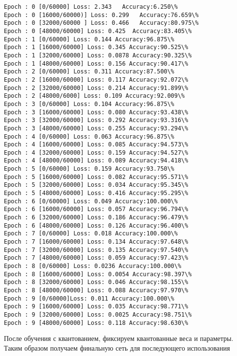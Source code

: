 \documentclass[oneside,final,12pt]{extreport}
\begin{document}
    \begin{Verbatim}[commandchars=\\\{\}]
Epoch : 0 [0/60000] Loss: 2.343   Accuracy:6.250\%
Epoch : 0 [16000/60000)] Loss: 0.299   Accuracy:76.659\%
Epoch : 0 [32000/60000 ] Loss: 0.466   Accuracy:80.975\%
Epoch : 0 [48000/60000] Loss: 0.425  Accuracy:83.405\%
Epoch : 1 [0/60000] Loss: 0.144 Accuracy:96.875\%
Epoch : 1 [16000/60000] Loss: 0.345 Accuracy:90.525\%
Epoch : 1 [32000/60000] Loss: 0.0878 Accuracy:90.325\%
Epoch : 1 [48000/60000] Loss: 0.156 Accuracy:90.417\%
Epoch : 2 [0/60000] Loss: 0.311 Accuracy:87.500\%
Epoch : 2 [16000/60000] Loss: 0.117 Accuracy:92.072\%
Epoch : 2 [32000/60000] Loss: 0.214 Accuracy:91.899\%
Epoch : 2 [48000/6000] Loss: 0.109 Accuracy:92.009\%
Epoch : 3 [0/60000] Loss: 0.104 Accuracy:96.875\%
Epoch : 3 [16000/60000] Loss: 0.080 Accuracy:93.438\%
Epoch : 3 [32000/60000] Loss: 0.292 Accuracy:93.316\%
Epoch : 3 [48000/60000] Loss: 0.255 Accuracy:93.294\%
Epoch : 4 [0/60000] Loss: 0.063 Accuracy:96.875\%
Epoch : 4 [16000/60000] Loss: 0.085 Accuracy:94.573\%
Epoch : 4 [32000/60000] Loss: 0.159 Accuracy:94.527\%
Epoch : 4 [48000/60000] Loss: 0.089 Accuracy:94.418\%
Epoch : 5 [0/60000] Loss: 0.159 Accuracy:93.750\%
Epoch : 5 [16000/60000] Loss: 0.082 Accuracy:95.571\%
Epoch : 5 [32000/60000] Loss: 0.034 Accuracy:95.345\%
Epoch : 5 [48000/60000] Loss: 0.416 Accuracy:95.295\%
Epoch : 6 [0/60000] Loss: 0.049 Accuracy:100.000\%
Epoch : 6 [16000/60000] Loss: 0.057 Accuracy:96.794\%
Epoch : 6 [32000/60000] Loss: 0.186 Accuracy:96.479\%
Epoch : 6 [48000/60000] Loss: 0.126 Accuracy:96.400\%
Epoch : 7 [0/60000] Loss: 0.018 Accuracy:100.000\%
Epoch : 7 [16000/60000] Loss: 0.134 Accuracy:97.648\%
Epoch : 7 [32000/60000] Loss: 0.135 Accuracy:97.540\%
Epoch : 7 [48000/60000] Loss: 0.059 Accuracy:97.423\%
Epoch : 8 [0/60000] Loss: 0.0236 Accuracy:100.000\%
Epoch : 8 [16000/60000] Loss: 0.0054 Accuracy:98.397\%
Epoch : 8 [32000/60000] Loss: 0.046 Accuracy:98.155\%
Epoch : 8 [48000/60000] Loss: 0.088 Accuracy:97.970\%
Epoch : 9 [0/60000]Loss: 0.011 Accuracy:100.000\%
Epoch : 9 [16000/60000] Loss: 0.035 Accuracy:98.771\%
Epoch : 9 [32000/60000] Loss: 0.0025 Accuracy:98.751\%
Epoch : 9 [48000/60000] Loss: 0.118 Accuracy:98.630\%
\end{Verbatim}

    После обучения с квантованием, фиксируем квантованные веса и параметры.
Таким образом получаем финальную сеть для последующего использования
\end{document}
